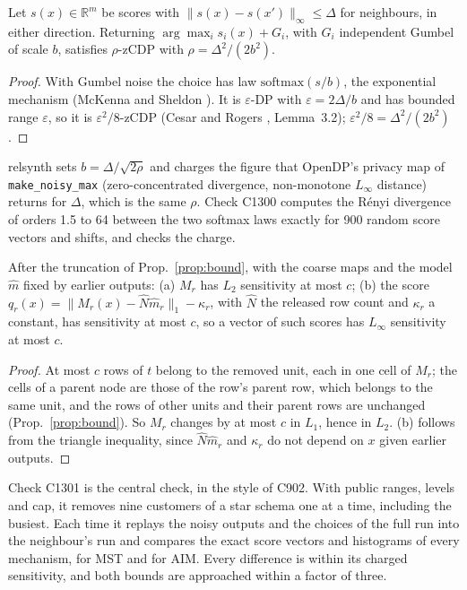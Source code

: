 \setcounter{proposition}{1299}
\begin{proposition}\label{prop:noisymax}
Let $s(x)\in\mathbb{R}^m$ be scores with $\|s(x)-s(x')\|_\infty\le\Delta$ for neighbours, in either direction. Returning $\arg\max_i s_i(x)+G_i$, with $G_i$ independent Gumbel of scale $b$, satisfies $\rho$-zCDP with $\rho=\Delta^2/(2b^2)$.
\end{proposition}
\begin{proof}
With Gumbel noise the choice has law $\mathrm{softmax}(s/b)$, the exponential mechanism (McKenna and Sheldon \cite{mckenna2020pf}). It is $\varepsilon$-DP with $\varepsilon=2\Delta/b$ and has bounded range $\varepsilon$, so it is $\varepsilon^2/8$-zCDP (Cesar and Rogers \cite{cesar2021}, Lemma~3.2); $\varepsilon^2/8=\Delta^2/(2b^2)$.
\end{proof}
\noindent relsynth sets $b=\Delta/\sqrt{2\rho}$ and charges the figure that OpenDP's privacy map of \texttt{make\_noisy\_max} (zero-concentrated divergence, non-monotone $L_\infty$ distance) returns for $\Delta$, which is the same $\rho$. Check C1300 computes the R\'enyi divergence of orders 1.5 to 64 between the two softmax laws exactly for 900 random score vectors and shifts, and checks the charge.

\setcounter{proposition}{1300}
\begin{proposition}\label{prop:pairsens}
After the truncation of Prop.~\ref{prop:bound}, with the coarse maps and the model $\hat m$ fixed by earlier outputs: (a) $M_r$ has $L_2$ sensitivity at most $c$; (b) the score $q_r(x)=\|M_r(x)-\hat N\hat m_r\|_1-\kappa_r$, with $\hat N$ the released row count and $\kappa_r$ a constant, has sensitivity at most $c$, so a vector of such scores has $L_\infty$ sensitivity at most $c$.
\end{proposition}
\begin{proof}
At most $c$ rows of $t$ belong to the removed unit, each in one cell of $M_r$; the cells of a parent node are those of the row's parent row, which belongs to the same unit, and the rows of other units and their parent rows are unchanged (Prop.~\ref{prop:bound}). So $M_r$ changes by at most $c$ in $L_1$, hence in $L_2$. (b) follows from the triangle inequality, since $\hat N\hat m_r$ and $\kappa_r$ do not depend on $x$ given earlier outputs.
\end{proof}
\noindent Check C1301 is the central check, in the style of C902. With public ranges, levels and cap, it removes nine customers of a star schema one at a time, including the busiest. Each time it replays the noisy outputs and the choices of the full run into the neighbour's run and compares the exact score vectors and histograms of every mechanism, for MST and for AIM. Every difference is within its charged sensitivity, and both bounds are approached within a factor of three.

